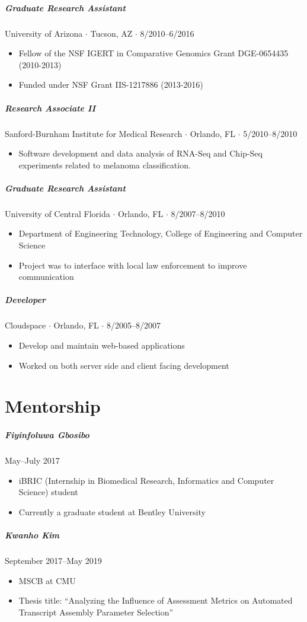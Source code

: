 \documentclass[10pt,letterpaper]{article}
\newcommand{\bigdot}{$\cdot$\xspace}
\begin{document}
\subparagraph{Graduate Research Assistant}
University of Arizona \bigdot Tucson, AZ \bigdot 8/2010--6/2016 
\begin{itemize}
    \item Fellow of the NSF IGERT in Comparative Genomics Grant DGE-0654435 (2010-2013)
    \item Funded under NSF Grant IIS-1217886 (2013-2016)
\end{itemize}

\subparagraph{Research Associate II}
Sanford-Burnham Institute for Medical Research \bigdot Orlando, FL \bigdot 5/2010--8/2010 
\begin{itemize}
    \item Software development and data analysis of RNA-Seq and Chip-Seq experiments related to melanoma classification.
\end{itemize}

\subparagraph{Graduate Research Assistant}
University of Central Florida \bigdot Orlando, FL \bigdot 8/2007--8/2010 
\begin{itemize}
    \item Department of Engineering Technology, College of Engineering and Computer Science
    \item Project was to interface with local law enforcement to improve communication
\end{itemize}

\subparagraph{Developer}
Cloudspace \bigdot Orlando, FL \bigdot 8/2005--8/2007 
\begin{itemize}
    \item Develop and maintain web-based applications 
    \item Worked on both server side and client facing development
\end{itemize}

\section*{Mentorship}
\subparagraph{Fiyinfoluwa Gbosibo} May--July 2017
\begin{itemize}
\item iBRIC (Internship in Biomedical Research, Informatics and Computer Science) student
\item Currently a graduate student at Bentley University
\end{itemize}

\subparagraph{Kwanho Kim} September 2017--May 2019
\begin{itemize}
\item MSCB at CMU
\item Thesis title: ``Analyzing the Influence of Assessment Metrics on Automated Transcript Assembly Parameter Selection''
\end{itemize}
\end{document}

